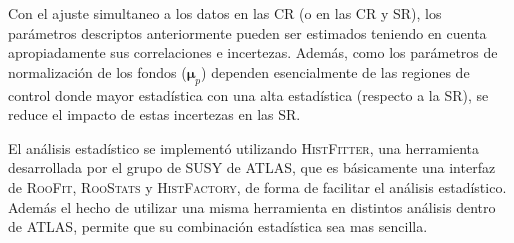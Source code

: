 Con el ajuste simultaneo a los datos en las CR (o en las CR y SR), los
parámetros descriptos anteriormente pueden ser estimados teniendo en cuenta
apropiadamente sus correlaciones e incertezas. Además, como los parámetros
de normalización de los fondos ($\bm{\mu}_p$) dependen esencialmente de las
regiones de control donde mayor estadística con una alta estadística (respecto a la SR),
se reduce el impacto de estas incertezas en las SR.


El análisis estadístico se implementó utilizando \textsc{HistFitter}\cite{HistFitter}, una herramienta
desarrollada por el grupo de SUSY de ATLAS, que es básicamente una interfaz de
\textsc{RooFit}, \textsc{RooStats}\cite{Moneta:2010pm} y
\textsc{HistFactory}\cite{Cranmer:1456844}, de forma de facilitar el análisis
estadístico. Además el hecho de utilizar una misma herramienta en distintos
análisis dentro de ATLAS, permite que su combinación estadística sea mas
sencilla.













